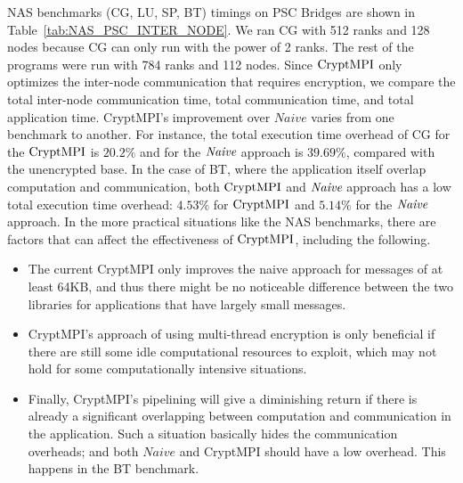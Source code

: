 {
NAS benchmarks (CG, LU, SP, BT)
timings on PSC Bridges are shown in Table~\ref{tab:NAS_PSC_INTER_NODE}.
We ran CG with 512 ranks and 128 nodes because CG can only run with the power of 2 ranks.
The rest of the programs were run with 784 ranks and 112 nodes. 
Since $\textrm{CryptMPI}$ only optimizes the inter-node communication that requires encryption,
we compare the total inter-node communication time, total communication time, and total
application time. CryptMPI's improvement over $Naive$ varies from one benchmark to another.
For instance, the total execution time
overhead of CG for the $\textrm{CryptMPI}$ is $20.2\%$ and for the ${\emph{Naive}}$ approach is $39.69\%$,
compared with the unencrypted base. In the case of BT, where the application itself overlap
computation and communication, both $\textrm{CryptMPI}$ and ${\emph{Naive}}$ approach
has a low total execution time overhead: $4.53\%$ for $\textrm{CryptMPI}$ and $5.14\%$ for the ${\emph{Naive}}$
approach. In the more practical situations like
the NAS benchmarks, there are factors that can affect the effectiveness
of $\textrm{CryptMPI}$, including the following.

\begin{itemize}
\item The current CryptMPI only improves the naive approach
  for messages of at least 64KB, and thus there might be no noticeable
    difference between the two libraries
    for applications that have largely small messages.

\item CryptMPI's approach of using multi-thread encryption is only
  beneficial if there are still some idle computational resources to
    exploit, which may not hold for some computationally intensive situations.

\item Finally, CryptMPI's pipelining will give a diminishing return if
  there is already a significant overlapping between computation and
    communication in the application. Such a situation basically hides
    the communication overheads; and both $Naive$ and CryptMPI should have
    a low overhead. This happens in the BT benchmark.
\end{itemize}
        
\begin{table}[!tbp]
		

\end{table}}
